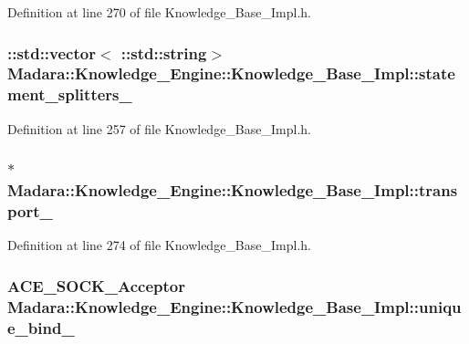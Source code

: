 Definition at line 270 of file Knowledge\_\-Base\_\-Impl.h.

\hypertarget{classMadara_1_1Knowledge__Engine_1_1Knowledge__Base__Impl_a96497fa896d6ade4c84dbf4b6262ab96}{
\subsubsection[{statement\_\-splitters\_\-}]{\setlength{\rightskip}{0pt plus 5cm}::std::vector$<$ ::std::string$>$ {\bf Madara::Knowledge\_\-Engine::Knowledge\_\-Base\_\-Impl::statement\_\-splitters\_\-}}}
\label{d3/d3c/classMadara_1_1Knowledge__Engine_1_1Knowledge__Base__Impl_a96497fa896d6ade4c84dbf4b6262ab96}


Definition at line 257 of file Knowledge\_\-Base\_\-Impl.h.

\hypertarget{classMadara_1_1Knowledge__Engine_1_1Knowledge__Base__Impl_a3bdc08dfe120ef9b76702575b82f24bb}{
\subsubsection[{transport\_\-}]{$\ast$ {\bf Madara::Knowledge\_\-Engine::Knowledge\_\-Base\_\-Impl::transport\_\-}}}
\label{d3/d3c/classMadara_1_1Knowledge__Engine_1_1Knowledge__Base__Impl_a3bdc08dfe120ef9b76702575b82f24bb}


Definition at line 274 of file Knowledge\_\-Base\_\-Impl.h.

\hypertarget{classMadara_1_1Knowledge__Engine_1_1Knowledge__Base__Impl_a063f54bf5e0d35010a9e266169d16981}{
\subsubsection[{unique\_\-bind\_\-}]{\setlength{\rightskip}{0pt plus 5cm}ACE\_\-SOCK\_\-Acceptor {\bf Madara::Knowledge\_\-Engine::Knowledge\_\-Base\_\-Impl::unique\_\-bind\_\-}}}
\label{d3/d3c/classMadara_1_1Knowledge__Engine_1_1Knowledge__Base__Impl_a063f54bf5e0d35010a9e266169d16981}


